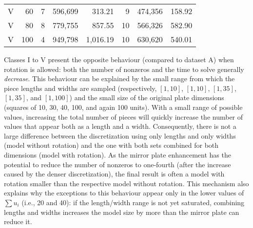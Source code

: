 \begin{table}[!t]
\begin{tabular}{crrrrrrr}
V &  60 & 7 & 596,699 & 313.21 & 9 & 474,356 & 158.92 \\
V &  80 & 8 & 779,755 & 857.55 & 10 & 566,326 & 582.90 \\
V & 100 & 4 & 949,798 & 1,016.19 & 10 & 630,620 & 540.01 \\\hline\hline
\end{tabular}%
\end{table}

Classes I to V present the opposite behaviour (compared to dataset A) when rotation is allowed: both the number of nonzeros and the time to solve generally \emph{decrease}.
This behaviour can be explained by the small range from which the piece lengths and widths are sampled (respectively, \([1, 10]\), \([1, 10]\), \([1, 35]\), \([1, 35]\), and \([1, 100]\)) and the small size of the original plate dimensions (squares of 10, 30, 40, 100, and again 100 units).
With a small range of possible values, increasing the total number of pieces will quickly increase the number of values that appear both as a length and a width.
Consequently, there is not a large difference between the discretization using only lengths and only widths (model without rotation) and the one with both sets combined for both dimensions (model with rotation).
As the mirror plate enhancement has the potential to reduce the number of nonzeros to one-fourth (after the increase caused by the denser discretization), the final result is often a model with rotation smaller than the respective model without rotation.
This mechanism also explains why the exceptions to this behaviour appear only in the lower values of~\(\sum u_i\) (i.e., 20 and 40): if the length/width range is not yet saturated, combining lengths and widths increases the model size by more than the mirror plate can reduce it.


